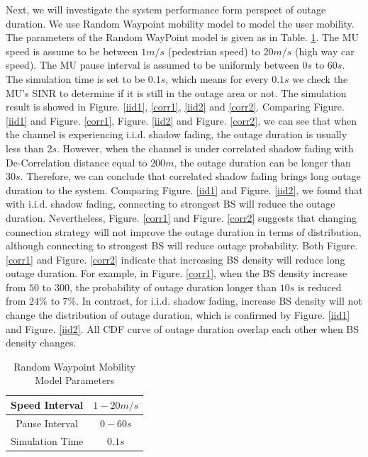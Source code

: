 \par Next, we will investigate the system performance form perspect of outage duration. We use Random Waypoint mobility model to model the user mobility. The parameters of the Random WayPoint model is given as in Table. \ref{RWP}. The MU speed is assume to be between $1m/s$ (pedestrian speed) to $20m/s$ (high way car speed). The MU pause interval is assumed to be uniformly between $0s$ to $60s$. The simulation time is set to be $0.1s$, which means for every $0.1s$ we check the MU's SINR to determine if it is still in the outage area or not.  The simulation result is showed in Figure. \ref{iid1}, \ref{corr1}, \ref{iid2} and \ref{corr2}. Comparing Figure. \ref{iid1} and Figure. \ref{corr1}, Figure. \ref{iid2} and Figure. \ref{corr2}, we can see that when the channel is experiencing i.i.d. shadow fading, the outage duration is usually less than $2s$. However,  when the channel is under correlated shadow fading with De-Correlation distance equal to $200m$, the outage duration can be longer than $30s$. Therefore, we can conclude that correlated shadow fading brings long outage duration to the system. Comparing Figure. \ref{iid1} and Figure. \ref{iid2}, we found that with i.i.d. shadow fading, connecting to strongest BS will reduce the outage duration.  Nevertheless, Figure. \ref{corr1} and Figure. \ref{corr2} suggests that changing connection strategy will not improve the outage duration in terms of distribution, although connecting to strongest BS will reduce outage probability. Both Figure. \ref{corr1} and Figure. \ref{corr2} indicate that increasing BS density will reduce long outage duration. For example, in Figure. \ref{corr1}, when the BS density increase from $50$ to $300$, the probability of outage duration longer than $10s$ is reduced from $24\%$ to $7\%$. In contrast, for i.i.d. shadow fading, increase BS density will not change the distribution of outage duration, which is confirmed by Figure. \ref{iid1} and Figure. \ref{iid2}. All CDF curve of outage duration overlap each other when BS density changes. 
\begin{table}
\centering
\caption{\label{RWP}Random Waypoint Mobility Model Parameters}

\begin{tabular}{|c|c|}

\hline
Speed Interval & $1 - 20m/s$\\
\hline
Pause Interval & $0 - 60s$\\
\hline
Simulation Time & $0.1s$\\
\hline
\end{tabular}

\end{table}

